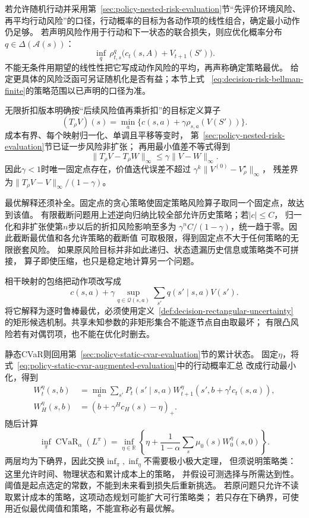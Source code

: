 若允许随机行动并采用第~\ref{sec:policy-nested-risk-evaluation}节“先评价环境风险、
再平均行动风险”的口径，行动概率的目标为各动作项的线性组合，确定最小动作仍足够。
若声明风险作用于行动和下一状态的联合损失，则应优化概率分布$q\in\Delta(\mathcal A(s))$：
\[
  \inf_q\,\rho^q_{t,s}\bigl(c_t(s,A)+V_{t+1}(S')\bigr).
\]
不能无条件用期望的线性性把它写成动作风险的平均，再声称确定策略最优。
给定更具体的风险泛函可另证随机化是否有益；本节上式
~\eqref{eq:decision-risk-bellman-finite}的策略范围以已声明的口径为准。

无限折扣版本明确按“后续风险值再乘折扣”的目标定义算子
\begin{equation}
  (T_\rho V)(s)=\min_a
    \{c(s,a)+\gamma\rho_{s,a}(V(S'))\}.
  \label{eq:decision-risk-bellman-operator}
\end{equation}
成本有界、每个映射归一化、单调且平移等变时，
第~\ref{sec:policy-nested-risk-evaluation}节已证一步风险非扩张；
再用最小值差不等式得到
\begin{equation}
  \lVert T_\rho V-T_\rho W\rVert_\infty
  \leq\gamma\lVert V-W\rVert_\infty.
  \label{eq:decision-risk-bellman-contraction}
\end{equation}
因此$\gamma<1$时唯一固定点存在，价值迭代误差不超过
$\gamma^k\lVert V^{(0)}-V^\star_\rho\rVert_\infty$，
残差界为$\lVert T_\rho V-V\rVert_\infty/(1-\gamma)$。

最优解释还须补全。固定点的贪心策略使固定策略风险算子取同一个固定点，故达到该值。
有限截断问题用上述逆向归纳比较全部允许历史策略；若$|c|\leq C$，
归一化和非扩张使第$n$步以后的折扣风险影响至多为
$\gamma^nC/(1-\gamma)$，统一趋于零。因此截断最优值和各允许策略的截断值
可取极限，得到固定点不大于任何策略的无限嵌套风险。
如果原风险目标并非如此递归、状态遗漏历史信息或策略类不可拼接，
算子即使压缩，也只是稳定地计算另一个问题。

相干映射的包络把动作项改写成
\[
  c(s,a)+\gamma\sup_{q\in\mathcal Q(s,a)}
    \sum_{s'}q(s'\mid s,a)V(s').
\]
将它解释为逐时鲁棒最优，必须使用定义~\ref{def:decision-rectangular-uncertainty}
的矩形候选机制。共享未知参数的非矩形集合不能逐节点自由取最坏；
有限凸风险若有对偶罚项，也不能在优化时删去。

静态CVaR则回用第~\ref{sec:policy-static-cvar-evaluation}节的累计状态。
固定$\eta$，将式~\eqref{eq:policy-static-cvar-augmented-evaluation}中的行动概率汇总
改成行动最小化，得到
\[
  \begin{aligned}
    W_t^\eta(s,b)&=\min_a\sum_{s'}P_t(s'\mid s,a)
      W_{t+1}^\eta(s',b+\gamma^tc_t(s,a)),\\
    W_H^\eta(s,b)&=(b+\gamma^Hc_H(s)-\eta)_+.
  \end{aligned}
\]
随后计算
\[
  \inf_\pi\operatorname{CVaR}_\alpha(L^\pi)
  =\inf_{\eta\in\mathbb R}
    \left\{\eta+\frac{1}{1-\alpha}
      \sum_s\mu_0(s)W_0^\eta(s,0)\right\}.
\]
两层均为下确界，因此交换$\inf_\pi,\inf_\eta$不需要极小极大定理，
但须说明策略类：这里允许时间、物理状态和累计成本上的策略，
并假设可测选择与所需达到性。阈值是起点选定的常数，不能到未来看到损失后重新挑选。
若原问题只允许不读取累计成本的策略，这项动态规划可能扩大可行策略类；
若只存在下确界，可使用近似最优阈值和策略，不能宣称必有最优解。

